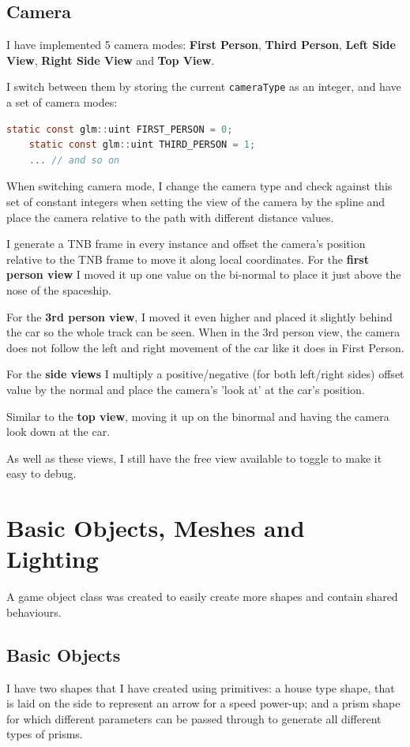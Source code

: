 \documentclass[11pt]{report}
\begin{document}
\subsection*{Camera}
I have implemented 5 camera modes: \textbf{First Person}, \textbf{Third Person}, \textbf{Left Side View}, \textbf{Right Side View} and \textbf{Top View}.

I switch between them by storing the current \colorbox{mygrey}{\lstinline{cameraType}} as an integer, and have a set of camera modes:
\begin{lstlisting}[language=c]
    static const glm::uint FIRST_PERSON = 0;
    static const glm::uint THIRD_PERSON = 1;
    ... // and so on
\end{lstlisting}
When switching camera mode, I change the camera type and check against this set of constant integers when setting the view of the camera by the spline and place the camera relative to the path with different distance values.

I generate a TNB frame in every instance and offset the camera's position relative to the TNB frame to move it along local coordinates. For the \textbf{first person view} I moved it up one value on the bi-normal to place it just above the nose of the spaceship.

For the \textbf{3rd person view}, I moved it even higher and placed it slightly behind the car so the whole track can be seen. When in the 3rd person view, the camera does not follow the left and right movement of the car like it does in First Person.

For the \textbf{side views} I multiply a positive/negative (for both left/right sides) offset value by the normal and place the camera's 'look at' at the car's position.

Similar to the \textbf{top view}, moving it up on the binormal and having the camera look down at the car.

As well as these views, I still have the free view available to toggle to make it easy to debug.

\newpage
\section*{Basic Objects, Meshes and Lighting}
A game object class was created to easily create more shapes and contain shared behaviours.

\subsection*{Basic Objects}
I have two shapes that I have created using primitives: a house type shape, that is laid on the side to represent an arrow for a speed power-up; and a prism shape for which different parameters can be passed through to generate all different types of prisms. 
\end{document}
